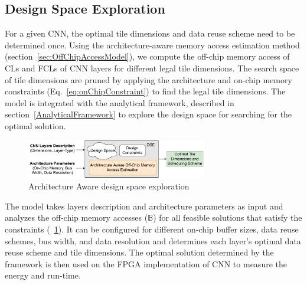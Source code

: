 \documentclass[a4paper,10pt]{article}
\newcommand{\numBytesOffChip}{\mathbb{B}}
\begin{document}
\subsection{Design Space Exploration}

For a given CNN, the optimal tile dimensions and data reuse scheme need to be determined once. Using the  architecture-aware memory access estimation method (section~\ref{sec:OffChipAccessModel}), we compute the off-chip memory access of CLs and FCLs of CNN layers for different legal tile dimensions. The search space of tile dimensions are pruned by applying the architecture and on-chip memory constraints (Eq.~\ref{eq:onChipConstraint}) to find the legal tile dimensions. The model is integrated with the analytical framework, described in section~\ref{AnalyticalFramework} to explore the design space for searching for the optimal solution.
\begin{figure}[!htb]
	\centering
    \captionsetup{font=sf}	
	\includegraphics[width=0.7\textwidth]{offlineFrameworkForCNN}
	\caption{Architecture Aware design space exploration}
	\label{fig:offlineFrameworkForCNN}
\end{figure}
The model takes layers description and architecture parameters as input and analyzes the off-chip memory accesses ($\numBytesOffChip$) for all feasible solutions that satisfy the constraints (\figurename~\ref{fig:offlineFrameworkForCNN}). It can be configured for different on-chip buffer sizes, data reuse schemes, bus width, and data resolution and determines each layer's optimal data reuse scheme and tile dimensions. The optimal solution determined by the framework is then used on the FPGA implementation of CNN to measure the energy and run-time. 
\end{document}
